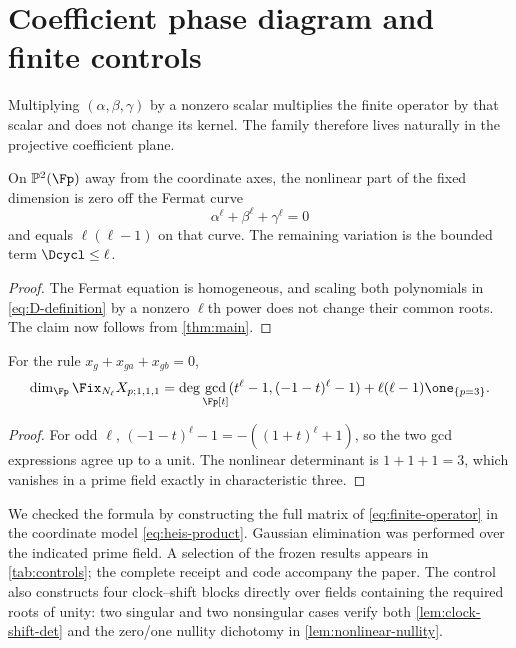 \section{Coefficient phase diagram and finite controls}

Multiplying $(\alpha,\beta,\gamma)$ by a nonzero scalar multiplies the finite
operator by that scalar and does not change its kernel.  The family therefore
lives naturally in the projective coefficient plane.

\begin{corollary}\label{cor:phase-diagram}
On $\mathbb P^2(\Fp)$ away from the coordinate axes, the nonlinear part of
the fixed dimension is zero off the Fermat curve
\[
 \alpha^\ell+\beta^\ell+\gamma^\ell=0
\]
and equals $\ell(\ell-1)$ on that curve.  The remaining variation is the
bounded term $\Dcycl\le\ell$.
\end{corollary}

\begin{proof}
The Fermat equation is homogeneous, and scaling both polynomials in
\eqref{eq:D-definition} by a nonzero $\ell$th power does not change their
common roots.  The claim now follows from \cref{thm:main}.
\end{proof}

\begin{corollary}\label{cor:unit}
For the rule $x_g+x_{ga}+x_{gb}=0$,
\[
 \dim_{\Fp}\Fix_{N_\ell}X_{p;1,1,1}
 =\deg\gcd_{\Fp[t]}(t^\ell-1,(-1-t)^\ell-1)
  +\ell(\ell-1)\one_{\{p=3\}}.
\]
\end{corollary}

\begin{proof}
For odd $\ell$,
$(-1-t)^\ell-1=-((1+t)^\ell+1)$, so the two gcd expressions agree up to a
unit.  The nonlinear determinant is $1+1+1=3$, which vanishes in a prime
field exactly in characteristic three.
\end{proof}

We checked the formula by constructing the full matrix of
\eqref{eq:finite-operator} in the coordinate model \eqref{eq:heis-product}.
Gaussian elimination was performed over the indicated prime field.  A
selection of the frozen results appears in \cref{tab:controls}; the complete
receipt and code accompany the paper.  The control also constructs four
clock--shift blocks directly over fields containing the required roots of
unity: two singular and two nonsingular cases verify both
\cref{lem:clock-shift-det} and the zero/one nullity dichotomy in
\cref{lem:nonlinear-nullity}.

